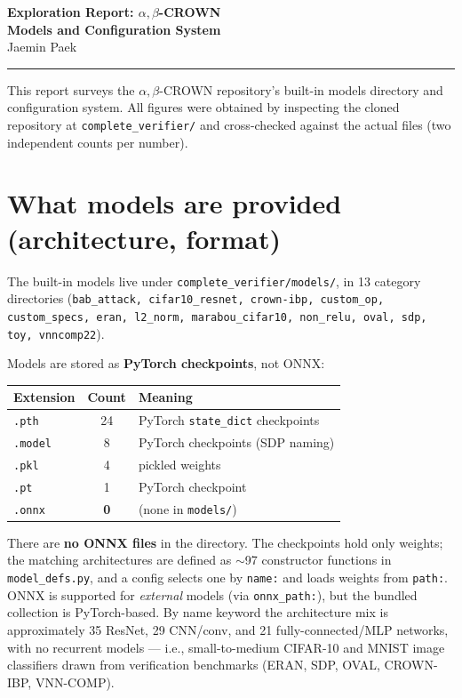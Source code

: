 \documentclass[10pt]{article}
\newcommand{\abc}{$\alpha,\beta$-CROWN}
\begin{document}
\begin{center}
  {\LARGE\bfseries Exploration Report: $\alpha,\beta$-CROWN\\[2pt]
   Models and Configuration System}\\[10pt]
  {\normalsize Jaemin Paek}\\[2pt]
  \rule{\textwidth}{0.4pt}
\end{center}

\noindent
This report surveys the \abc{} repository's built-in models directory and configuration
system. All figures were obtained by inspecting the cloned repository at
\texttt{complete\_verifier/} and cross-checked against the actual files (two independent
counts per number).

\section{What models are provided (architecture, format)}
The built-in models live under \texttt{complete\_verifier/models/}, in 13 category
directories (\texttt{bab\_attack, cifar10\_resnet, crown-ibp, custom\_op, custom\_specs,
eran, l2\_norm, marabou\_cifar10, non\_relu, oval, sdp, toy, vnncomp22}).

Models are stored as \textbf{PyTorch checkpoints}, not ONNX:

\begin{table}[H]\centering\small
\begin{tabular}{lcl}
\toprule
Extension & Count & Meaning \\
\midrule
\texttt{.pth}  & 24 & PyTorch \texttt{state\_dict} checkpoints \\
\texttt{.model}& 8  & PyTorch checkpoints (SDP naming) \\
\texttt{.pkl}  & 4  & pickled weights \\
\texttt{.pt}   & 1  & PyTorch checkpoint \\
\texttt{.onnx} & \textbf{0} & (none in \texttt{models/}) \\
\bottomrule
\end{tabular}
\end{table}

There are \textbf{no ONNX files} in the directory. The checkpoints hold only weights; the
matching architectures are defined as $\sim$97 constructor functions in
\texttt{model\_defs.py}, and a config selects one by \texttt{name:} and loads weights from
\texttt{path:}. ONNX is supported for \emph{external} models (via \texttt{onnx\_path:}), but
the bundled collection is PyTorch-based. By name keyword the architecture mix is
approximately 35 ResNet, 29 CNN/conv, and 21 fully-connected/MLP networks, with no
recurrent models --- i.e., small-to-medium CIFAR-10 and MNIST image classifiers drawn from
verification benchmarks (ERAN, SDP, OVAL, CROWN-IBP, VNN-COMP).
\end{document}
